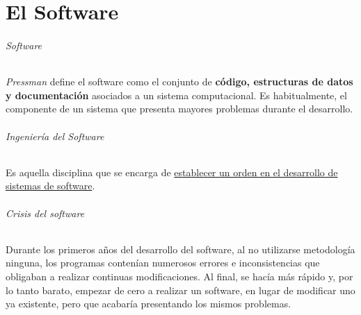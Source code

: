 \part{El Software}

\paragraph{Software}
\textit{Pressman} define el software como el conjunto de \textbf{código, estructuras de datos y documentación} asociados a un sistema computacional. Es habitualmente, el componente de un sistema que presenta mayores problemas durante el desarrollo.

\paragraph{Ingeniería del Software}
Es aquella disciplina que se encarga de \uline{establecer un orden en el desarrollo de sistemas de software}.

\paragraph{Crisis del software}
Durante los primeros años del desarrollo del software, al no utilizarse metodología ninguna, los programas contenían numerosos errores e inconsistencias que obligaban a realizar continuas modificaciones. Al final, se hacía más rápido y, por lo tanto barato, empezar de cero a realizar un software, en lugar de modificar uno ya existente, pero que acabaría presentando los mismos problemas.

